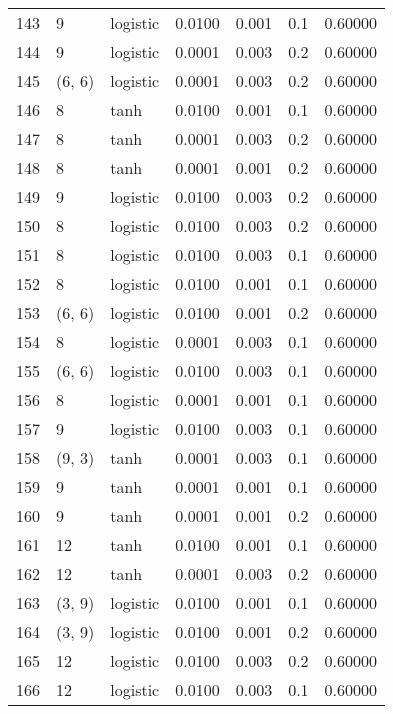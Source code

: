 \begin{tabular}{lllrrrr}
143 &           9 &  logistic &  0.0100 &  0.001 &  0.1 &   0.60000 \\
144 &           9 &  logistic &  0.0001 &  0.003 &  0.2 &   0.60000 \\
145 &      (6, 6) &  logistic &  0.0001 &  0.003 &  0.2 &   0.60000 \\
146 &           8 &      tanh &  0.0100 &  0.001 &  0.1 &   0.60000 \\
147 &           8 &      tanh &  0.0001 &  0.003 &  0.2 &   0.60000 \\
148 &           8 &      tanh &  0.0001 &  0.001 &  0.2 &   0.60000 \\
149 &           9 &  logistic &  0.0100 &  0.003 &  0.2 &   0.60000 \\
150 &           8 &  logistic &  0.0100 &  0.003 &  0.2 &   0.60000 \\
151 &           8 &  logistic &  0.0100 &  0.003 &  0.1 &   0.60000 \\
152 &           8 &  logistic &  0.0100 &  0.001 &  0.1 &   0.60000 \\
153 &      (6, 6) &  logistic &  0.0100 &  0.001 &  0.2 &   0.60000 \\
154 &           8 &  logistic &  0.0001 &  0.003 &  0.1 &   0.60000 \\
155 &      (6, 6) &  logistic &  0.0100 &  0.003 &  0.1 &   0.60000 \\
156 &           8 &  logistic &  0.0001 &  0.001 &  0.1 &   0.60000 \\
157 &           9 &  logistic &  0.0100 &  0.003 &  0.1 &   0.60000 \\
158 &      (9, 3) &      tanh &  0.0001 &  0.003 &  0.1 &   0.60000 \\
159 &           9 &      tanh &  0.0001 &  0.001 &  0.1 &   0.60000 \\
160 &           9 &      tanh &  0.0001 &  0.001 &  0.2 &   0.60000 \\
161 &          12 &      tanh &  0.0100 &  0.001 &  0.1 &   0.60000 \\
162 &          12 &      tanh &  0.0001 &  0.003 &  0.2 &   0.60000 \\
163 &      (3, 9) &  logistic &  0.0100 &  0.001 &  0.1 &   0.60000 \\
164 &      (3, 9) &  logistic &  0.0100 &  0.001 &  0.2 &   0.60000 \\
165 &          12 &  logistic &  0.0100 &  0.003 &  0.2 &   0.60000 \\
166 &          12 &  logistic &  0.0100 &  0.003 &  0.1 &   0.60000 \\

\end{tabular}
